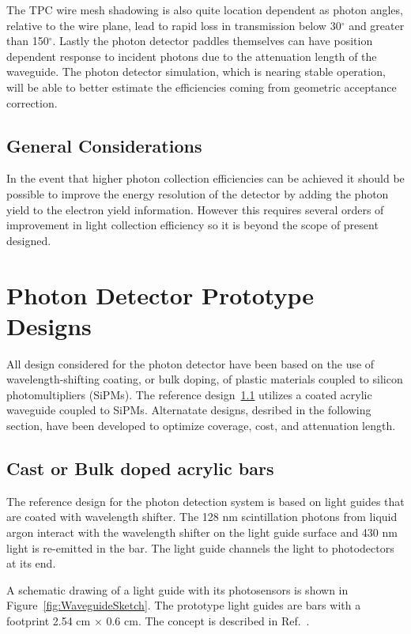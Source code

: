 The TPC wire mesh shadowing is also quite location dependent as photon
angles, relative to the wire plane, lead to rapid loss in transmission
below 30$^{\circ}$ and greater than 150$^{\circ}$. Lastly the photon
detector paddles themselves can have position dependent response to
incident photons due to the attenuation length of the waveguide. The
photon detector simulation, which is nearing stable operation, will be
able to better estimate the efficiencies coming from geometric
acceptance correction.

\subsection{General Considerations}

In the event that higher photon collection efficiencies can be
achieved it should be possible to improve the energy resolution of the
detector by adding the photon yield to the electron yield information.
However this requires several orders of improvement in light
collection efficiency so it is beyond the scope of present designed.

\section{Photon Detector Prototype Designs}

All design considered for the photon detector have been based on the
use of wavelength-shifting coating, or bulk doping, of plastic
materials coupled to silicon photomultipliers (SiPMs). The reference
design~\ref{sec_bars} utilizes a coated acrylic waveguide coupled to
SiPMs. Alternatate designs, desribed in the following section, have
been developed to optimize coverage, cost, and attenuation length. 

\subsection{Cast or Bulk doped acrylic bars}
\label{sec_bars}

The reference design for the photon detection system is based on light
guides that are coated with wavelength shifter. The 128 nm
scintillation photons from liquid argon interact with the wavelength
shifter on the light guide surface and 430 nm light is re-emitted in
the bar.  The light guide channels the light to photodectors at its
end.

A schematic drawing of a light guide with its photosensors is shown in
Figure~\ref{fig:WaveguideSketch}. The prototype light guides are bars
with a footprint 2.54 cm $\times$ 0.6 cm.  The concept is described in
Ref.~\cite{bib:MITbars}.

